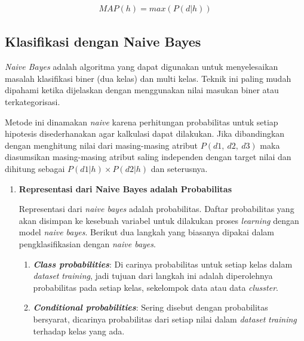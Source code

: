\begin{subs}
	\begin{equation}\label{eq: nbayes4}
	\begin{split}
	MAP(h) = max(P(d|h))
	\end{split}
	\end{equation}
		
	\subsection{Klasifikasi dengan Naive Bayes}
	\label{sec:sub_sec2_class_bayes}
	\vspace{1ex}
	
	\textit{Naive Bayes} adalah algoritma yang dapat digunakan untuk menyelesaikan masalah klasifikasi biner (dua kelas) dan multi kelas. Teknik ini paling mudah dipahami ketika dijelaskan dengan menggunakan nilai masukan biner atau terkategorisasi.
	\vspace{1ex}
	
	Metode ini dinamakan \textit{naive} karena perhitungan probabilitas untuk setiap hipotesis disederhanakan agar kalkulasi dapat dilakukan. Jika dibandingkan dengan menghitung nilai dari masing-masing atribut $P(d1,\ d2,\ d3)$ maka  diasumsikan masing-masing atribut saling independen dengan target nilai dan dihitung sebagai $P(d1|h) \times P(d2|h)$ dan seterusnya.
	\vspace{1ex}
	
	\begin{enumerate}[label=\textbf{\arabic*).}]
		
		\item \textbf{Representasi dari Naive Bayes adalah Probabilitas}
		\setlength{\parindent}{0.8cm}
	
		Representasi dari \textit{naive bayes} adalah probabilitas. Daftar probabilitas yang akan disimpan ke kesebuah variabel untuk dilakukan proses \textit{learning} dengan model \textit{naive bayes}. Berikut dua langkah yang biasanya dipakai dalam pengklasifikasian dengan \textit{naive bayes}.
		
		\begin{enumerate}[label=\textbf{\alph*.}]
			\item \textbf{\textit{Class probabilities}}: Di carinya probabilitas untuk setiap kelas dalam \textit{dataset} \textit{training}, jadi tujuan dari langkah ini adalah diperolehnya probabilitas pada setiap kelas, sekelompok data atau data \textit{clusster}.
			\item \textbf{\textit{Conditional probabilities}}: Sering disebut dengan probabilitas bersyarat, dicarinya probabilitas dari setiap nilai dalam \textit{dataset} \textit{training} terhadap kelas yang ada.
		\end{enumerate}
	

\end{enumerate}
\end{subs}
